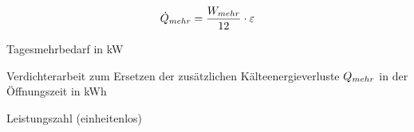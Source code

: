 \begin{equation}
	\pmehr = \frac{\lmehr}{12} \cdot \epsilon
\label{spmehr}
\end{equation}

\begin{description}[\dth]

	\item[$\pmehr$] Tagesmehrbedarf in kW
	\item[$\lmehr$] Verdichterarbeit zum Ersetzen der zus\"atzlichen
	K\"alteenergieverluste $Q_{mehr}$ in der \"Offnungszeit in kWh
	\item[$\epsilon$] Leistungszahl (einheitenlos)

\end{description}
\vspace{0.5cm}



